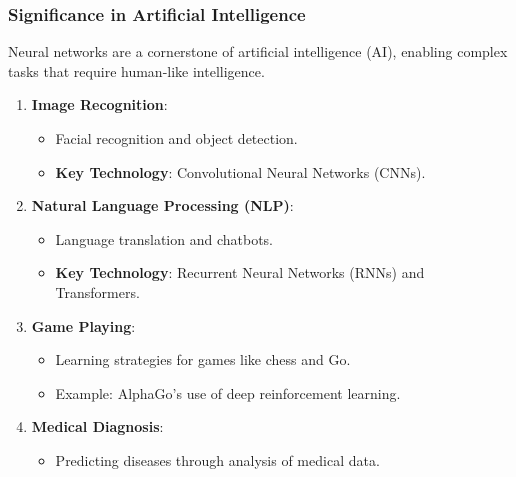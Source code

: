 \documentclass[aspectratio=169]{beamer}
\begin{document}
\begin{frame}[fragile]
    \frametitle{Significance in Artificial Intelligence}
    Neural networks are a cornerstone of artificial intelligence (AI), enabling complex tasks that require human-like intelligence.

    \begin{enumerate}
        \item \textbf{Image Recognition}:
            \begin{itemize}
                \item Facial recognition and object detection.
                \item \textbf{Key Technology}: Convolutional Neural Networks (CNNs).
            \end{itemize}

        \item \textbf{Natural Language Processing (NLP)}:
            \begin{itemize}
                \item Language translation and chatbots.
                \item \textbf{Key Technology}: Recurrent Neural Networks (RNNs) and Transformers.
            \end{itemize}

        \item \textbf{Game Playing}:
            \begin{itemize}
                \item Learning strategies for games like chess and Go.
                \item Example: AlphaGo's use of deep reinforcement learning.
            \end{itemize}

        \item \textbf{Medical Diagnosis}:
            \begin{itemize}
                \item Predicting diseases through analysis of medical data.
            \end{itemize}
    \end{enumerate}
\end{frame}
\end{document}

